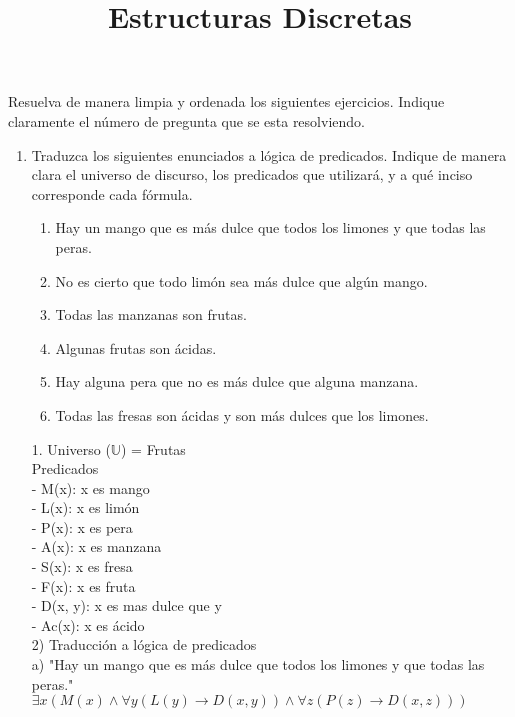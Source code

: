 \documentclass[a4paper,10pt]{article}
\title{Estructuras Discretas}
\begin{document}
\maketitle

\vspace{-15pt}
Resuelva de manera limpia y ordenada los siguientes ejercicios. 
Indique claramente el n\'umero de pregunta que se esta resolviendo.


\begin{enumerate}

	\item {} Traduzca los siguientes enunciados a l\'ogica de predicados. 
Indique de manera clara el universo de discurso, los predicados que utilizar\'a, y a qu\'e inciso corresponde cada f\'ormula.
   \begin{enumerate}
   	\item Hay un mango que es m\'as dulce que todos los limones y que todas las peras.
	\item No es cierto que todo lim\'on sea m\'as dulce que algún mango.
    \item Todas las manzanas son frutas.
    \item Algunas frutas son \'acidas.     
   \item Hay alguna pera que no es m\'as dulce que alguna manzana.
    \item Todas las fresas son ácidas y son más dulces que los limones.
   \end{enumerate}


 1. Universo ($\mathbb U$) = Frutas\\
Predicados\\
- M(x): x es mango\\
- L(x): x es lim\'on\\
- P(x): x es pera\\
- A(x): x es manzana\\
- S(x): x es fresa\\
- F(x): x es fruta\\
- D(x, y): x es mas dulce que y\\
- Ac(x): x es \'acido\\

2) Traducción a lógica de predicados\\

a) "Hay un mango que es m\'as dulce que todos los limones y que todas
las peras."\\
$\exists x (M(x) \land \forall y (L(y) \rightarrow D(x, y)) \land \forall z (P(z) \rightarrow D(x, z)))$\\


\end{enumerate}
\end{document}
